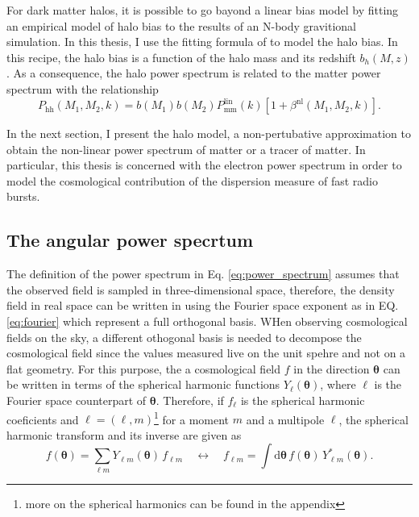 For dark matter halos, it is possible to go bayond a linear bias model by fitting an empirical model of halo bias to the results of an N-body gravitional simulation. In this thesis, I use the fitting formula of \citet{tinker2010large} to model the halo bias. In this recipe, the halo bias is a function of the halo mass and its redshift $b_h (M, z)$. As a consequence, the halo power spectrum is related to the matter power spectrum with the relationship
\begin{equation} \label{eq:halo_spectrum}
    P_{\mathrm{hh}}(M_1, M_2, k) = b(M_1) b(M_2) P_{\mathrm{mm}}^{\mathrm{lin}}(k) [1 + \beta^{\mathrm{nl}}(M_1, M_2, k)].
\end{equation}

In the next section, I present the halo model, a non-pertubative approximation to obtain the non-linear power spectrum of matter or a tracer of matter. In particular, this thesis is concerned with the electron power spectrum in order to model the cosmological contribution of the dispersion measure of fast radio bursts.
\subsection{The angular power specrtum}
The definition of the power spectrum in Eq. \ref{eq:power_spectrum} assumes that the observed field is sampled in three-dimensional space, therefore, the density field in real space can be written in using the Fourier space exponent as in EQ. \ref{eq:fourier} which represent a full orthogonal basis. WHen observing cosmological fields on the sky, a different othogonal basis is needed to decompose the cosmological field since the values measured live on the unit spehre and not on a flat geometry. For this purpose, the a cosmological field $f$ in the direction $\boldsymbol{\theta}$ can be written in terms of the spherical harmonic functions $Y_{\boldsymbol{\ell}}(\boldsymbol{\theta})$, where $\boldsymbol{\ell}$ is the Fourier space counterpart of $\boldsymbol{\theta}$. Therefore, if $f_{\boldsymbol{\ell}}$ is the spherical harmonic coeficients and $\boldsymbol{\ell} = (\ell, m)$\footnote{more on the spherical harmonics can be found in the appendix} for a moment $m$ and a multipole $\ell$, the spherical harmonic transform and its inverse are given as
\begin{equation}
    f(\boldsymbol{\theta}) = \sum_{\ell m} Y_{\ell m}(\boldsymbol{\theta}) \, f_{\ell m} \quad \leftrightarrow \quad f_{\ell m} = \int \mathrm{d}\boldsymbol{\theta} \, f(\boldsymbol{\theta}) \, Y_{\ell m}^*(\boldsymbol{\theta}).
\end{equation}

